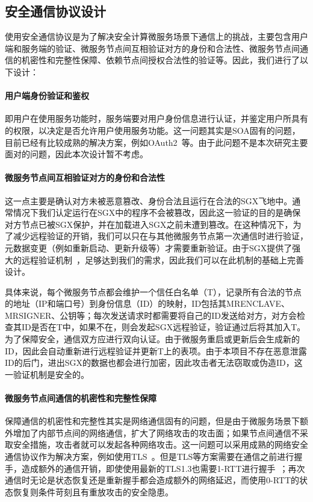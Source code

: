 \subsection{安全通信协议设计}

使用安全通信协议是为了解决安全计算微服务场景下通信上的挑战，主要包含用户端和服务端的验证、微服务节点间互相验证对方的身份和合法性、微服务节点间通信的机密性和完整性保障、依赖节点间授权合法性的验证等。因此，我们进行了以下设计：

\paragraph{用户端身份验证和鉴权}
即用户在使用服务功能时，服务端要对用户身份信息进行认证，并鉴定用户所具有的权限，以决定是否允许用户使用服务功能。这一问题其实是SOA固有的问题，目前已经有比较成熟的解决方案，例如OAuth2~\cite{oauth2spec}等。由于此问题不是本次研究主要面对的问题，因此本次设计暂不考虑。

\paragraph{微服务节点间互相验证对方的身份和合法性}
这一点主要是确认对方未被恶意篡改、身份合法且运行在合法的SGX飞地中。通常情况下我们认定运行在SGX中的程序不会被篡改，因此这一验证的目的是确保对方节点已被SGX保护，并在加载进入SGX之前未遭到篡改。在这种情况下，为了减少远程验证的开销，我们可以只在与其他微服务节点第一次通信时进行验证，元数据变更（例如重新启动、更新升级等）才需要重新验证。由于SGX提供了强大的远程验证机制~\cite{intel-sgx-ra}，足够达到我们的需求，因此我们可以在此机制的基础上完善设计。

具体来说，每个微服务节点都会维护一个信任白名单（T），记录所有合法的节点的地址（IP和端口号）到身份信息（ID）的映射，ID包括其MRENCLAVE、MRSIGNER、公钥等；每次发送请求时都需要将自己的ID发送给对方，对方会检查其ID是否在T中，如果不在，则会发起SGX远程验证，验证通过后将其加入T。为了保障安全，通信双方应进行双向认证。由于微服务重启或更新后会生成新的ID，因此会自动重新进行远程验证并更新T上的表项。由于本项目不存在恶意泄露ID的后门，进出SGX的数据也都会进行加密，因此攻击者无法窃取或伪造ID，这一验证机制是安全的。

\paragraph{微服务节点间通信的机密性和完整性保障}
保障通信的机密性和完整性其实是网络通信固有的问题，但是由于微服务场景下额外增加了内部节点间的网络通信，扩大了网络攻击的攻击面；如果节点间通信不采取安全措施，攻击者就可以发起各种网络攻击。这一问题可以采用成熟的网络安全通信协议作为解决方案，例如使用TLS~\cite{8446}。但是TLS等方案需要在通信之前进行握手，造成额外的通信开销，即使使用最新的TLS1.3也需要1-RTT进行握手~\cite{8446}；再次通信时无论是状态恢复还是重新握手都会造成额外的网络延迟，而使用0-RTT的状态恢复则条件苛刻且有重放攻击的安全隐患。

